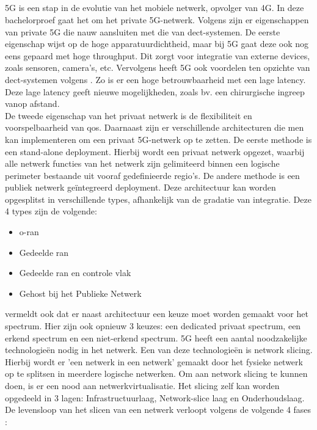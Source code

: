 \subsection{}%
\label{sec:5g}%
5G is een stap in de evolutie van het mobiele netwerk, opvolger van 4G. In deze bachelorproef gaat het om het private 5G-netwerk. Volgens \textcite{wen2021private} zijn er eigenschappen van private 5G die nauw aansluiten met die van \gls{dect}-systemen. De eerste eigenschap wijst op de hoge apparatuurdichtheid, maar bij 5G gaat deze ook nog eens gepaard met hoge throughput. Dit zorgt voor integratie van externe devices, zoals sensoren, camera's, etc. Vervolgens heeft 5G ook voordelen ten opzichte van \gls{dect}-systemen volgens \textcite{wen2021private}. Zo is er een hoge betrouwbaarheid met een lage latency. Deze lage latency geeft nieuwe mogelijkheden, zoals bv. een chirurgische ingreep vanop afstand.\\ De tweede eigenschap van het privaat netwerk is de flexibiliteit en voorspelbaarheid van \gls{qos}. Daarnaast zijn er verschillende architecturen die men kan implementeren om een privaat 5G-netwerk op te zetten. De eerste methode is een stand-alone deployment. Hierbij wordt een privaat netwerk opgezet, waarbij alle netwerk functies van het netwerk zijn gelimiteerd binnen een logische perimeter bestaande uit vooraf gedefinieerde regio's. De andere methode is een publiek netwerk geïntegreerd deployment. Deze architectuur kan worden opgesplitst in verschillende types, afhankelijk van de gradatie van integratie. Deze 4 types zijn de volgende:

\begin{itemize}
  \item \gls{o-ran}
  \item Gedeelde \gls{ran}
  \item Gedeelde \gls{ran} en controle vlak
  \item Gehost bij het Publieke Netwerk
\end{itemize}

\textcite{wen2021private} vermeldt ook dat er naast architectuur een keuze moet worden gemaakt voor het spectrum. Hier zijn ook opnieuw 3 keuzes: een dedicated privaat spectrum, een erkend spectrum en een niet-erkend spectrum. 
5G heeft een aantal noodzakelijke technologieën nodig in het netwerk. Een van deze technologieën is network slicing. Hierbij wordt er 'een netwerk in een netwerk' gemaakt door het fysieke netwerk op te splitsen in meerdere logische netwerken. Om aan network slicing te kunnen doen, is er een nood aan netwerkvirtualisatie. Het slicing zelf kan worden opgedeeld in 3 lagen: Infrastructuurlaag, Network-slice laag en Onderhoudslaag. De levensloop van het slicen van een netwerk verloopt volgens de volgende 4 fases \autocite{wen2021private}:

